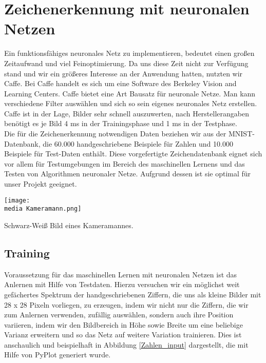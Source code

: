\section{Zeichenerkennung mit neuronalen Netzen}
Ein funktionsfähiges neuronales Netz zu implementieren, bedeutet einen großen Zeitaufwand und viel Feinoptimierung. Da uns diese Zeit nicht zur Verfügung stand und wir ein größeres Interesse an der Anwendung hatten, nutzten wir Caffe. Bei Caffe handelt es sich um eine Software des Berkeley Vision and Learning Centers. Caffe bietet eine Art Bausatz für neuronale Netze. Man kann verschiedene Filter auswählen und sich so sein eigenes neuronales Netz erstellen. Caffe ist in der Lage, Bilder sehr schnell auszuwerten, nach Herstellerangaben benötigt es je Bild 4 ms in der Trainingsphase und 1 ms in der Testphase. \\
Die für die Zeichenerkennung notwendigen Daten beziehen wir aus der MNIST-Datenbank, die 60.000 handgeschriebene Beispiele für Zahlen und 10.000 Beispiele für Test-Daten enthält. Diese vorgefertigte Zeichendatenbank eignet sich vor allem für Testumgebungen im Bereich des maschinellen Lernens und das Testen von Algorithmen neuronaler Netze. Aufgrund dessen ist sie optimal für unser Projekt geeignet.
\begin{dsafigure}
\begin{center}
	\texttt{[image: \\media Kameramann.png]}
	\caption{Schwarz-Weiß Bild eines Kameramannes.}
	\label{Kameramann}
\end{center}
\end{dsafigure}

\subsection{Training}
Voraussetzung für das maschinellen Lernen mit neuronalen Netzen ist das Anlernen mit Hilfe von Testdaten. Hierzu versuchen wir ein möglichst weit gefächertes Spektrum der handgeschriebenen Ziffern, die uns als kleine Bilder mit 28 x 28 Pixeln vorliegen, zu erzeugen, indem wir nicht nur die Ziffern, die wir zum Anlernen verwenden, zufällig auswählen, sondern auch ihre Position variieren, indem wir den Bildbereich in Höhe sowie Breite um eine beliebige Varianz erweitern und so das Netz auf weitere Variation trainieren. Dies ist anschaulich und beispielhaft in Abbildung \ref{Zahlen_input} dargestellt, die mit Hilfe von PyPlot generiert wurde.\\


